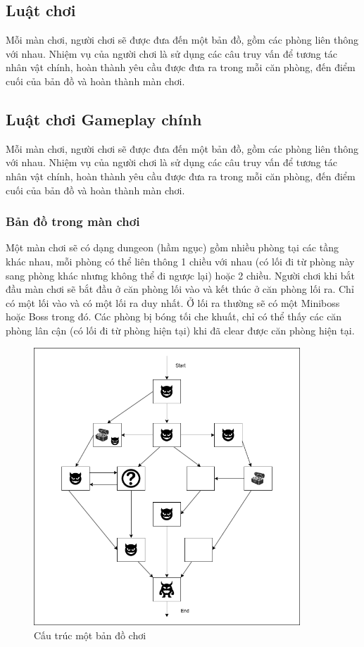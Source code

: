 \subsection{Luật chơi}
\hspace*{1cm} Mỗi màn chơi, người chơi sẽ được đưa đến một bản đồ, gồm các phòng liên thông với nhau. Nhiệm vụ của người chơi là sử dụng các câu truy vấn để tương tác nhân vật chính, hoàn thành yêu cầu được đưa ra trong mỗi căn phòng, đến điểm cuối của bản đồ và hoàn thành màn chơi.

\subsection{Luật chơi Gameplay chính}
\hspace*{1cm} Mỗi màn chơi, người chơi sẽ được đưa đến một bản đồ, gồm các phòng liên thông với nhau. Nhiệm vụ của người chơi là sử dụng các câu truy vấn để tương tác nhân vật chính, hoàn thành yêu cầu được đưa ra trong mỗi căn phòng, đến điểm cuối của bản đồ và hoàn thành màn chơi.

\subsubsection{Bản đồ trong màn chơi}
\hspace*{1cm} Một màn chơi sẽ có dạng dungeon (hầm ngục) gồm nhiều phòng tại các tầng khác nhau, mỗi phòng có thể liên thông 1 chiều với nhau (có lối đi từ phòng này sang phòng khác nhưng không thể đi ngược lại) hoặc 2 chiều. Người chơi khi bắt đầu màn chơi sẽ bắt đầu ở căn phòng lối vào và kết thúc ở căn phòng lối ra. Chỉ có một lối vào và có một lối ra duy nhất. Ở lối ra thường sẽ có một Miniboss hoặc Boss trong đó. Các phòng bị bóng tối che khuất, chỉ có thể thấy các căn phòng lân cận (có lối đi từ phòng hiện tại) khi đã clear được căn phòng hiện tại.\\

\begin{figure}[H]
	\centering
	\includegraphics[width=10cm]{Images/SampleLevel.png}
	\vspace{0.5cm}
	\caption{Cấu trúc một bản đồ chơi}
\end{figure}

